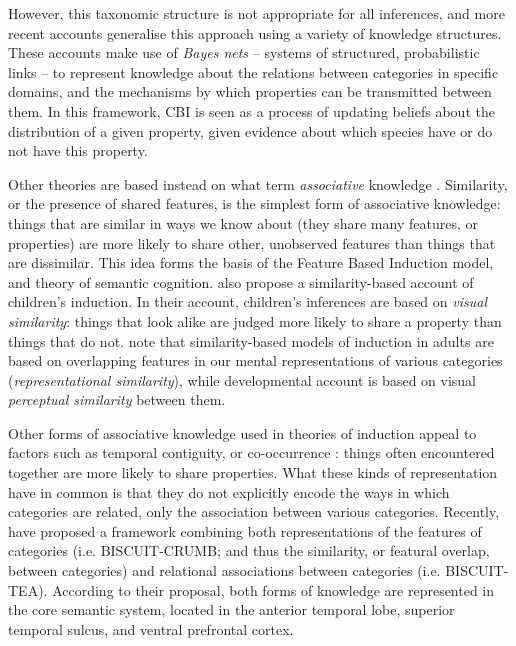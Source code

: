 However, this taxonomic structure is not appropriate for all inferences,
and more recent accounts
\citep{Kemp2009, Griffiths2009, Shafto2008, Tenenbaum2006}
generalise this approach using a variety of knowledge structures.
These accounts make use of \emph{Bayes nets}
-- systems of structured, probabilistic links --
to represent knowledge about the relations between categories in specific domains,
and the mechanisms by which properties can be transmitted between them.
In this framework, CBI is seen as a process of
updating beliefs about the distribution of a given property,
given evidence about which species have or do not have this property.

Other theories are based instead on
what \citet{Bright2014a} term \emph{associative} knowledge
\citep[e.g.][]{Sloman1993,Rogers2004,Sloutsky2004}.
Similarity, or the presence of shared features, is the simplest form of associative knowledge:
things that are similar in ways we know about
(they share many features, or properties)
are more likely to share other, unobserved features
than things that are dissimilar.
This idea forms the basis of the
 Feature Based Induction model,
and  theory of semantic cognition.
\citet{Sloutsky2004} also propose a similarity-based account of children's induction.
In their account, children's inferences are based on
\emph{visual similarity}:
things that look alike are judged more likely to share a property
than things that do not.
\citet{Fisher2015} note that
similarity-based models of induction in adults
are based on overlapping features in
our mental representations of various categories
(\emph{representational similarity}),
while  developmental account
is based on visual \emph{perceptual similarity} between them.

Other forms of associative knowledge
used in theories of induction
appeal to factors such as
temporal contiguity, or co-occurrence \citep{Gluck1988, Rescorla1977}:
things often encountered together
are more likely to share properties.
What these kinds of representation have in common is that
they do not explicitly encode the ways in which categories are related,
only the association between various categories.
Recently, \citet{Jackson2015} have proposed
a framework combining both representations of
the features of categories (i.e. BISCUIT-CRUMB;
and thus the similarity, or featural overlap, between categories)
and relational associations between categories (i.e. BISCUIT-TEA).
According to their proposal, both forms of knowledge
are represented in the core semantic system,
located in the anterior temporal lobe, superior temporal sulcus,
and ventral prefrontal cortex.

